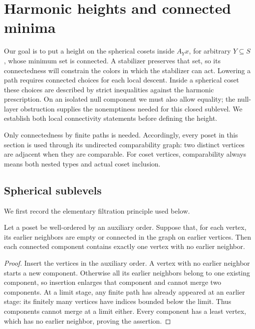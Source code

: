 \section{Harmonic heights and connected minima}
\label{sec:heights}

Our goal is to put a height on the spherical cosets inside \(A_Yx\), for
arbitrary \(Y\subseteq S\), whose minimum set is connected.  A stabilizer
preserves that set, so its connectedness will constrain the colors in
which the stabilizer can act.  Lowering a path requires connected choices
for each local descent.  Inside a spherical coset these choices are
described by strict inequalities against the harmonic prescription.
On an isolated null component we must also allow equality; the
null-layer obstruction supplies the nonemptiness needed for this closed
sublevel.  We establish both local connectivity statements before
defining the height.

Only connectedness by finite paths is needed.  Accordingly, every poset
in this section is used through its undirected comparability graph:
two distinct vertices are adjacent when they are comparable.  For coset
vertices, comparability always means both nested types and actual coset
inclusion.

\subsection{Spherical sublevels}

We first record the elementary filtration principle used below.

\begin{lemma}
\label{ht:vertex-filtration}
Let a poset be well-ordered by an auxiliary order.  Suppose that, for
each vertex, its earlier neighbors are empty or connected in the graph
on earlier vertices.  Then each connected component contains exactly
one vertex with no earlier neighbor.
\end{lemma}

\begin{proof}
Insert the vertices in the auxiliary order.  A vertex with no earlier
neighbor starts a new component.  Otherwise all its earlier neighbors
belong to one existing component, so insertion enlarges that component
and cannot merge two components.  At a limit stage, any finite path has
already appeared at an earlier stage: its finitely many vertices have
indices bounded below the limit.  Thus components cannot merge at a
limit either.  Every component has a least vertex, which has no earlier
neighbor, proving the assertion.
\end{proof}

